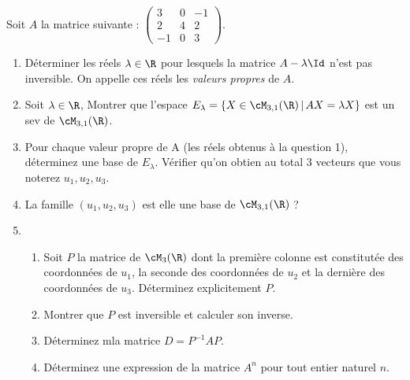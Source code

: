 







\begin{exercice}
Soit $A$ la matrice suivante : 
$\left(\begin{array}{ccc}
3&0&-1\\
2&4&2\\
-1&0&3
\end{array}
\right).$
\begin{enumerate}
\item Déterminer les réels $\lambda\in \R$ pour lesquels la matrice $A-\lambda \Id$ n'est pas  inversible. On appelle ces réels les \emph{valeurs propres} de $A$. 
\item Soit $\lambda\in \R$, Montrer que l'espace 
$E_\lambda =\{ X\in \cM_{3,1}(\R) \, |\, AX=\lambda X\}$ est un sev de $\cM_{3,1}(\R)$.
\item Pour chaque valeur propre de A  (les réels obtenus à la question 1), déterminez une base de $E_\lambda$. Vérifier qu'on obtien au total 3 vecteurs que vous noterez $u_1,u_2,u_3$. 
\item La famille $(u_1,u_2,u_3)$ est elle une base de $\cM_{3,1}(\R)$ ? 
\item \begin{enumerate}
\item Soit $P$ la matrice de $\cM_3(\R) $ dont la première colonne est constitutée des coordonnées de $u_1$, la seconde des coordonnées de $u_2$ et  la dernière des coordonnées de $u_3$. Déterminez explicitement $P$. 
\item Montrer que $P$ est inversible et calculer son inverse. 
\item Déterminez mla matrice $D=P^{-1} AP$. 
\item Déterminez une expression de la matrice $A^n$ pour tout entier naturel $n$. 
\end{enumerate}
\end{enumerate}
\end{exercice}

